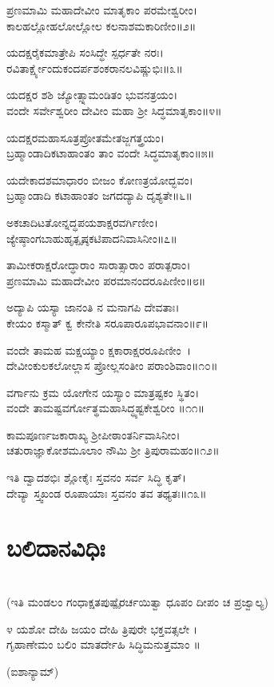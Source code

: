 ಪ್ರಣಮಾಮಿ ಮಹಾದೇವೀಂ ಮಾತೃಕಾಂ ಪರಮೇಶ್ವರೀಂ।\\
ಕಾಲಹಲ್ಲೋಹಲೋಲ್ಲೋಲ ಕಲನಾಶಮಕಾರಿಣೀಂ॥೨॥

ಯದಕ್ಷರೈಕಮಾತ್ರೇಪಿ ಸಂಸಿದ್ಧೇ ಸ್ಪರ್ಧತೇ ನರಃ।\\
ರವಿತಾರ್ಕ್ಷ್ಯೇಂದುಕಂದರ್ಪಶಂಕರಾನಲವಿಷ್ಣುಭಿಃ॥೩॥

ಯದಕ್ಷರ ಶಶಿ ಜ್ಯೋತ್ಸ್ನಾಮಂಡಿತಂ ಭುವನತ್ರಯಂ।\\
ವಂದೇ ಸರ್ವೇಶ್ವರೀಂ ದೇವೀಂ ಮಹಾ ಶ್ರೀ ಸಿದ್ಧಮಾತೃಕಾಂ॥೪॥

ಯದಕ್ಷರಮಹಾಸೂತ್ರಪ್ರೋತಮೇತಜ್ಜಗತ್ತ್ರಯಂ।\\
ಬ್ರಹ್ಮಾಂಡಾದಿಕಟಾಹಾಂತಂ ತಾಂ ವಂದೇ ಸಿದ್ಧಮಾತೃಕಾಂ॥೫॥

ಯದೇಕಾದಶಮಾಧಾರಂ ಬೀಜಂ ಕೋಣತ್ರಯೋದ್ಭವಂ।\\
ಬ್ರಹ್ಮಾಂಡಾದಿ ಕಟಾಹಾಂತಂ ಜಗದದ್ಯಾಪಿ ದೃಶ್ಯತೇ॥೬॥

ಅಕಚಾದಿಟತೋನ್ನದ್ಧಪಯಶಾಕ್ಷರವರ್ಗಿಣೀಂ।\\
ಜ್ಯೇಷ್ಠಾಂಗಬಾಹುಹೃತ್ಪೃಷ್ಠಕಟಿಪಾದನಿವಾಸಿನೀಂ॥೭॥

ತಾಮೀಕರಾಕ್ಷರೋದ್ಧಾರಾಂ ಸಾರಾತ್ಸಾರಾಂ ಪರಾತ್ಪರಾಂ।\\
ಪ್ರಣಮಾಮಿ ಮಹಾದೇವೀಂ ಪರಮಾನಂದರೂಪಿಣೀಂ॥೮॥

ಅದ್ಯಾಪಿ ಯಸ್ಯಾ ಜಾನಂತಿ ನ ಮನಾಗಪಿ ದೇವತಾಃ।\\
ಕೇಯಂ ಕಸ್ಮಾತ್ ಕ್ವ ಕೇನೇತಿ ಸರೂಪಾರೂಪಭಾವನಾಂ॥೯॥

ವಂದೇ ತಾಮಹ ಮಕ್ಷಯ್ಯಾಂ ಕ್ಷಕಾರಾಕ್ಷರರೂಪಿಣೀಂ~।\\
ದೇವೀಂಕುಲಕಲೋಲ್ಲಾಸ ಪ್ರೋಲ್ಲಸಂತೀಂ ಪರಾಂಶಿವಾಂ॥೧೦॥

ವರ್ಗಾನು ಕ್ರಮ ಯೋಗೇನ ಯಸ್ಯಾಂ ಮಾತ್ರಷ್ಟಕಂ ಸ್ಥಿತಂ।\\
ವಂದೇ ತಾಮಷ್ಟವರ್ಗೋತ್ಥಮಹಾಸಿದ್ಧ್ಯಷ್ಟಕೇಶ್ವರೀಂ ॥೧೧॥

ಕಾಮಪೂರ್ಣಜಕಾರಾಖ್ಯ ಶ್ರೀಪೀಠಾಂತರ್ನಿವಾಸಿನೀಂ।\\
ಚತುರಾಜ್ಞಾಕೋಶಮೂಲಾಂ ನೌಮಿ ಶ್ರೀ ತ್ರಿಪುರಾಮಹಂ॥೧೨॥

ಇತಿ ದ್ವಾದಶಭಿಃ ಶ್ಲೋಕೈಃ ಸ್ತವನಂ ಸರ್ವ ಸಿದ್ಧಿ ಕೃತ್।\\
ದೇವ್ಯಾ ಸ್ತ್ವಖಂಡ ರೂಪಾಯಾಃ ಸ್ತವನಂ ತವ ತಥ್ಯತಃ॥೧೩॥
\section{ಬಲಿದಾನವಿಧಿಃ}
\\ (ಇತಿ ಮಂಡಲಂ ಗಂಧಾಕ್ಷತಪುಷ್ಪೈರರ್ಚಯಿತ್ವಾ ಧೂಪಂ ದೀಪಂ ಚ ಪ್ರಜ್ವಾಲ್ಯ)

೪ ಯಶೋ ದೇಹಿ ಜಯಂ ದೇಹಿ ತ್ರಿಪುರೇ ಭಕ್ತವತ್ಸಲೇ ।\\ ಗೃಹಾಣೇಮಂ ಬಲಿಂ ಮಾತರ್ದೇಹಿ ಸಿದ್ಧಿಮನುತ್ತಮಾಂ ॥

(ಐಶಾನ್ಯಾಮ್)\\

